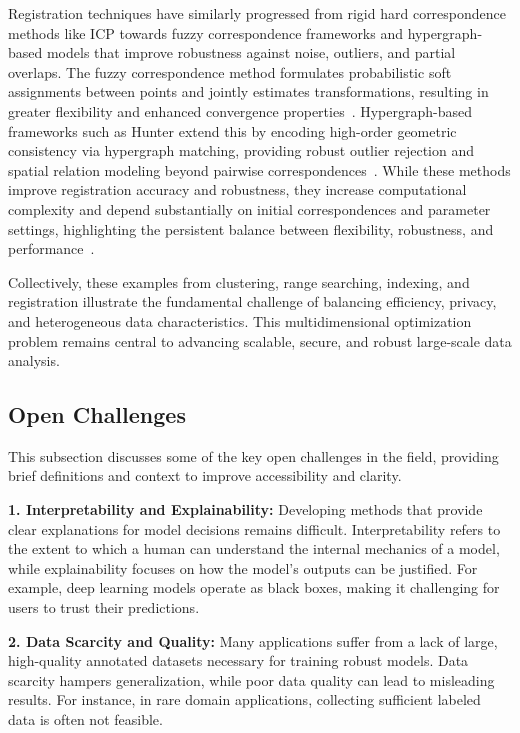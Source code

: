 \documentclass[sigconf]{acmart}
\begin{document}
Registration techniques have similarly progressed from rigid hard correspondence methods like ICP towards fuzzy correspondence frameworks and hypergraph-based models that improve robustness against noise, outliers, and partial overlaps. The fuzzy correspondence method formulates probabilistic soft assignments between points and jointly estimates transformations, resulting in greater flexibility and enhanced convergence properties~\cite{ref5}. Hypergraph-based frameworks such as Hunter extend this by encoding high-order geometric consistency via hypergraph matching, providing robust outlier rejection and spatial relation modeling beyond pairwise correspondences~\cite{ref6}. While these methods improve registration accuracy and robustness, they increase computational complexity and depend substantially on initial correspondences and parameter settings, highlighting the persistent balance between flexibility, robustness, and performance~\cite{ref5,ref6}.

Collectively, these examples from clustering, range searching, indexing, and registration illustrate the fundamental challenge of balancing efficiency, privacy, and heterogeneous data characteristics. This multidimensional optimization problem remains central to advancing scalable, secure, and robust large-scale data analysis.

\subsection{Open Challenges}

This subsection discusses some of the key open challenges in the field, providing brief definitions and context to improve accessibility and clarity.

\textbf{1. Interpretability and Explainability:} Developing methods that provide clear explanations for model decisions remains difficult. Interpretability refers to the extent to which a human can understand the internal mechanics of a model, while explainability focuses on how the model’s outputs can be justified. For example, deep learning models operate as black boxes, making it challenging for users to trust their predictions.

\textbf{2. Data Scarcity and Quality:} Many applications suffer from a lack of large, high-quality annotated datasets necessary for training robust models. Data scarcity hampers generalization, while poor data quality can lead to misleading results. For instance, in rare domain applications, collecting sufficient labeled data is often not feasible.
\end{document}
